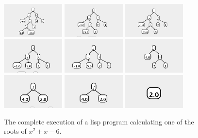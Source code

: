\documentclass{article}
\begin{document}
\begin{figure}
\begin{center}
\includegraphics[width=1.25in]{../board/pics/qf2151.png}
\includegraphics[width=1.25in]{../board/pics/qf2251.png}
\includegraphics[width=1.25in]{../board/pics/qf2301.png}
\includegraphics[width=1.25in]{../board/pics/qf2351.png}
\includegraphics[width=1.25in]{../board/pics/qf2401.png}
\includegraphics[width=1.25in]{../board/pics/qf2551.png}
\includegraphics[width=1.25in]{../board/pics/qf2601.png}
\includegraphics[width=1.25in]{../board/pics/qf2701.png}
\includegraphics[width=1.25in]{../board/pics/qf2801.png}
\end{center}
\caption{The complete execution of a lisp program calculating one of the roots of $x^2+x-6$.}
\label{lispanim}
\end{figure}
\end{document}
